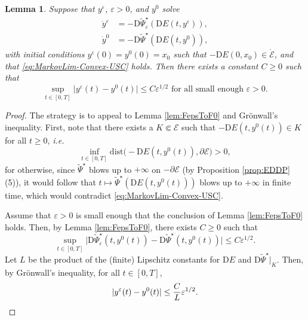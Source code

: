 \documentclass[reqno]{amsart}
\newtheorem{lemma}[theorem]{Lemma}
\theoremstyle{definition}
\begin{document}
\begin{lemma}
	\label{lem:FepsToF0Flows}
	Suppose that $y^{\varepsilon}$, ${\varepsilon} > 0$, and $y^{0}$ solve
	\begin{align*}
		\dot{y}^{\varepsilon} & = - {\mathrm{D}} {\widetilde{\Psi}}_{\varepsilon}^{\star} ({\mathrm{D}} E(t, y^{\varepsilon})), \\
		\dot{y}^{0} & = - {\mathrm{D}} {\widetilde{\Psi}}^{\star} ({\mathrm{D}} E(t, y^{0})),
	\end{align*}
	with initial conditions $y^{\varepsilon}(0) = y^{0}(0) = x_{0}$ such that $- {\mathrm{D}} E(0, x_{0}) \in \mathring{\mathcal{E}}$, and that \eqref{eq:MarkovLim-Convex-USC} holds.  Then there exists a constant $C \geq 0$ such that
	\[
		\sup_{t \in [0, T]} \big| y^{\varepsilon}(t) - y^{0}(t) \big| \leq C {\varepsilon}^{1/2} \text{ for all small enough } {\varepsilon} > 0.
	\]
\end{lemma}

\begin{proof}
	The strategy is to appeal to Lemma \ref{lem:FepsToF0} and Gr{\"o}nwall's inequality. First, note that there exists a $K \Subset {\mathcal{E}}$ such that $- {\mathrm{D}} E(t, y^{0}(t)) \in K$ for all $t \geq 0$, \emph{i.e.}
	\[
		\inf_{t \in [0, T]} \mathrm{dist} \big( - {\mathrm{D}} E(t, y^{0}(t)), \partial {\mathcal{E}} \big) > 0,
	\]
	for otherwise, since ${\widetilde{\Psi}}^{\star}$ blows up to $+ \infty$ on $- \partial {\mathcal{E}}$ (by Proposition \ref{prop:EDDP}(5)), it would follow that $t \mapsto {\widetilde{\Psi}}^{\star} ( {\mathrm{D}} E(t, y^{0}(t)) )$ blows up to $+ \infty$ in finite time, which would contradict \eqref{eq:MarkovLim-Convex-USC}.

	Assume that ${\varepsilon} > 0$ is small enough that the conclusion of Lemma \ref{lem:FepsToF0} holds.  Then, by Lemma \ref{lem:FepsToF0}, there exists $C \geq 0$ such that
	\[
		\sup_{t \in [0, T]} \big| {\mathrm{D}} {\widetilde{\Psi}}_{\varepsilon}^{\star} (t, y^{0}(t)) - {\mathrm{D}} {\widetilde{\Psi}}^{\star} (t, y^{0}(t)) \big| \leq C {\varepsilon}^{1/2}.
	\]
	Let $L$ be the product of the (finite) Lipschitz constants for ${\mathrm{D}} E$ and ${\mathrm{D}} {\widetilde{\Psi}}^{\star} |_{K}$.  Then, by Gr{\"o}nwall's inequality, for all $t \in [0, T]$,
	\[
		| y^{\varepsilon}(t) - y^{0}(t) | \leq \frac{C}{L} {\varepsilon}^{1/2}.  \qedhere
	\]
\end{proof}
\end{document}

